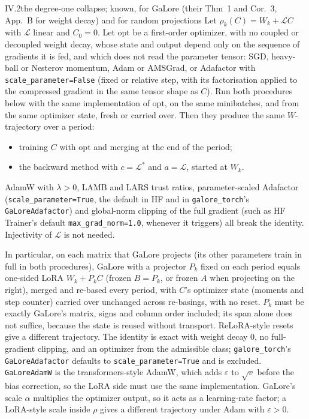 \begin{proposition}{IV.2}{the degree-one collapse; known, \citet{xtorrobahennigen2025duality} for GaLore (their Thm~1
and Cor.~3, App.~B for weight decay) and \citet{hao2024flora} for random projections}
Let $\rho_k(C)=W_k+\mathcal LC$ with $\mathcal L$ linear and $C_0=0$. Let $\mathrm{opt}$ be a first-order optimizer,
with no coupled or decoupled weight decay, whose state and output depend only on the sequence of gradients it is fed,
and which does not read the parameter tensor: SGD, heavy-ball or Nesterov momentum, Adam or AMSGrad, or Adafactor with
\texttt{scale\_\allowbreak parameter=False} (fixed or relative step, with its factorisation applied to the compressed gradient in
the same tensor shape as $C$). Run both procedures below with the same implementation of $\mathrm{opt}$, on the same
minibatches, and from the same optimizer state, fresh or carried over. Then they produce the same $W$-trajectory over a
period:
\begin{itemize}
  \item training $C$ with $\mathrm{opt}$ and merging at the end of the period;
  \item the backward method with $c=\mathcal L^*$ and $a=\mathcal L$, started at $W_k$.
\end{itemize}
AdamW with $\lambda>0$, LAMB and LARS trust ratios, parameter-scaled Adafactor (\texttt{scale\_\allowbreak parameter=True}, the
default in HF and in \texttt{galore\_torch}'s \texttt{GaLoreAdafactor}) and global-norm clipping of the full gradient
(such as HF Trainer's default \texttt{max\_grad\_norm=1.0}, whenever it triggers) all break the identity. Injectivity
of $\mathcal L$ is not needed.

In particular, on each matrix that GaLore projects (its other parameters train in full in both procedures), GaLore with
a projector $P_k$ fixed on each period equals one-sided LoRA $W_k+P_kC$ (frozen $B=P_k$, or frozen $A$ when projecting
on the right), merged and re-based every period, with $C$'s optimizer state (moments and step counter) carried over
unchanged across re-basings, with no reset. $P_k$ must be exactly GaLore's matrix, signs and column order included; its
span alone does not suffice, because the state is reused without transport. ReLoRA-style resets give a different
trajectory. The identity is exact with weight decay $0$, no full-gradient clipping, and an optimizer from the admissible
class; \texttt{galore\_torch}'s \texttt{GaLoreAdafactor} defaults to \texttt{scale\_\allowbreak parameter=True} and is excluded.
\texttt{GaLoreAdamW} is the transformers-style AdamW, which adds $\varepsilon$ to $\sqrt v$ before the bias
correction, so the LoRA side must use the same implementation. GaLore's scale $\alpha$ multiplies the optimizer output,
so it acts as a learning-rate factor; a LoRA-style scale inside $\rho$ gives a different trajectory under Adam with
$\varepsilon>0$.
\end{proposition}

